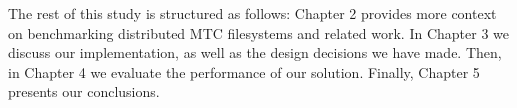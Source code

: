 The rest of this study is structured as follows: Chapter 2 provides more context on benchmarking distributed MTC filesystems and related work. In Chapter 3 we discuss our implementation, as well as the design decisions we have made. Then, in Chapter 4 we evaluate the performance of our solution. Finally, Chapter 5 presents our conclusions.